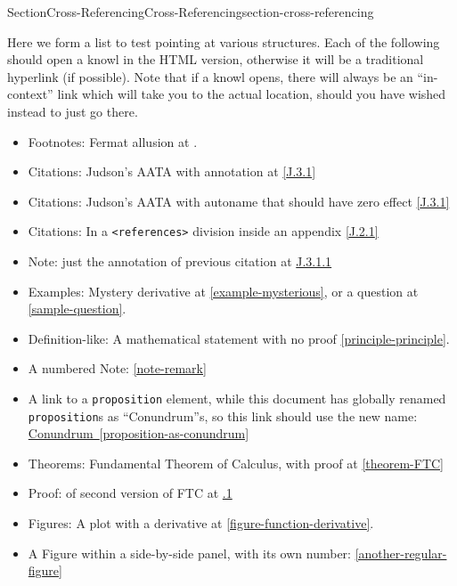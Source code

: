 \documentclass[twoside,10pt,]{article}
\newcommand{\xreffont}{\relax}
\newcommand{\mono}[1]{\texttt{#1}}
\numberwithin{equation}{section}
\begin{document}
\begin{sectionptx}{Section}{Cross-Referencing}{}{Cross-Referencing}{}{}{section-cross-referencing}
\par
Here we form a list to test pointing at various structures.  Each of the following should open a knowl in the HTML version, otherwise it will be a traditional hyperlink (if possible).  Note that if a knowl opens, there will always be an ``in-context'' link which will take you to the actual location, should you have  wished instead to just go there.%
\begin{itemize}[label=\textbullet]
\item{}Footnotes: Fermat allusion at \hyperref[footnote-fermat]{{\xreffont 2.1}}.%
\item{}Citations: Judson's AATA with annotation at \hyperlink{biblio-judson-AATA}{[{\xreffont J.3.1}]}%
\item{}Citations: Judson's AATA with autoname that should have zero effect \hyperlink{biblio-judson-AATA}{[{\xreffont J.3.1}]}%
\item{}Citations: In a \mono{<references>} division inside an appendix \hyperlink{biblio-strang-article-uno}{[{\xreffont J.2.1}]}%
\item{}Note: just the annotation of previous citation at \hyperlink{note-judson-AATA}{{\xreffont J.3.1.1}}%
\item{}Examples: Mystery derivative at \hyperref[example-mysterious]{{\xreffont\ref{example-mysterious}}}, or a question at \hyperref[sample-question]{{\xreffont\ref{sample-question}}}.%
\item{}Definition-like: A mathematical statement with no proof \hyperref[principle-principle]{{\xreffont\ref{principle-principle}}}.%
\item{}A numbered Note: \hyperref[note-remark]{{\xreffont\ref{note-remark}}}%
\item{}A link to a \mono{proposition} element, while this document has globally renamed \mono{proposition}s as ``Conundrum''s, so this link should use the new name: \hyperref[proposition-as-conundrum]{Conundrum~{\xreffont\ref{proposition-as-conundrum}}}%
\item{}Theorems: Fundamental Theorem of Calculus, with proof at \hyperref[theorem-FTC]{{\xreffont\ref{theorem-FTC}}}%
\item{}Proof: of second version of FTC at \hyperlink{proof-FTC-corollary}{{\xreffont 4.1.1}}%
\item{}Figures: A plot with a derivative at \hyperref[figure-function-derivative]{{\xreffont\ref{figure-function-derivative}}}.%
\item{}A Figure within a side-by-side panel, with its own number: \hyperref[another-regular-figure]{{\xreffont\ref{another-regular-figure}}}%

\end{itemize}
\end{sectionptx}
\end{document}
